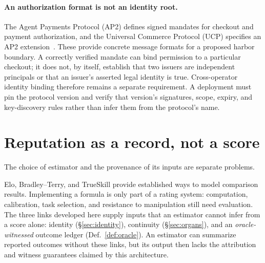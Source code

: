 \documentclass[11pt,a4paper]{article}
\theoremstyle{definition}
\newcounter{protocol}[section]
\begin{document}



\paragraph{An authorization format is not an identity root.}
The Agent Payments Protocol (AP2) defines signed mandates for checkout and payment authorization, and the Universal Commerce Protocol (UCP) specifies an AP2 extension~. These provide concrete message formats for a proposed harbor boundary. A correctly verified mandate can bind permission to a particular checkout; it does not, by itself, establish that two issuers are independent principals or that an issuer's asserted legal identity is true. Cross-operator identity binding therefore remains a separate requirement. A deployment must pin the protocol version and verify that version's signatures, scope, expiry, and key-discovery rules rather than infer them from the protocol's name.

\pdexercisepointer{\ref{ex:stp-local-vs-cross-operator}}{\ref{ex:stp-witness-log-substitute}}{\pageref{ex:stp-local-vs-cross-operator}}

\section{Reputation as a record, not a score}\label{sec:substrate}

The choice of estimator and the provenance of its inputs are separate problems.


\noindent Elo, Bradley--Terry, and TrueSkill provide established ways to model
comparison results. Implementing a formula is only part of a rating system:
computation, calibration, task selection, and resistance to manipulation still
need evaluation. The three links developed here supply inputs that an estimator
cannot infer from a score alone: identity (\S\ref{sec:identity}), continuity
(\S\ref{sec:organs}), and an \emph{oracle-witnessed} outcome ledger
(Def.~\ref{def:oracle}). An estimator can summarize reported outcomes without
these links, but its output then lacks the attribution and witness guarantees
claimed by this architecture.
\end{document}
